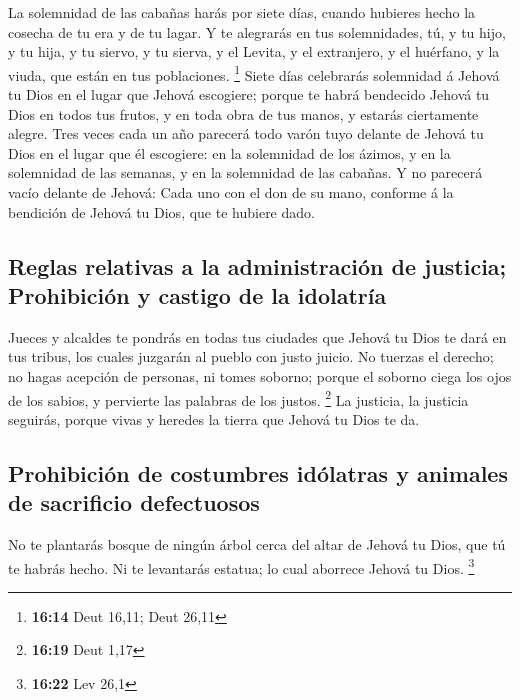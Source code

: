  La solemnidad de las cabañas harás por siete días,
cuando hubieres hecho la cosecha de tu era y de tu lagar.
 Y te alegrarás en tus solemnidades, tú, y tu hijo, y tu
hija, y tu siervo, y tu sierva, y el Levita, y el extranjero, y el
huérfano, y la viuda, que están en tus poblaciones. \footnote{\textbf{16:14}
  Deut 16,11; Deut 26,11}  Siete días celebrarás
solemnidad á Jehová tu Dios en el lugar que Jehová escogiere; porque te
habrá bendecido Jehová tu Dios en todos tus frutos, y en toda obra de
tus manos, y estarás ciertamente alegre.  Tres veces cada
un año parecerá todo varón tuyo delante de Jehová tu Dios en el lugar
que él escogiere: en la solemnidad de los ázimos, y en la solemnidad de
las semanas, y en la solemnidad de las cabañas. Y no parecerá vacío
delante de Jehová:  Cada uno con el don de su mano,
conforme á la bendición de Jehová tu Dios, que te hubiere dado.

\hypertarget{reglas-relativas-a-la-administraciuxf3n-de-justicia-prohibiciuxf3n-y-castigo-de-la-idolatruxeda}{%
\subsection{Reglas relativas a la administración de justicia;
Prohibición y castigo de la
idolatría}\label{reglas-relativas-a-la-administraciuxf3n-de-justicia-prohibiciuxf3n-y-castigo-de-la-idolatruxeda}}

 Jueces y alcaldes te pondrás en todas tus ciudades que
Jehová tu Dios te dará en tus tribus, los cuales juzgarán al pueblo con
justo juicio.  No tuerzas el derecho; no hagas acepción
de personas, ni tomes soborno; porque el soborno ciega los ojos de los
sabios, y pervierte las palabras de los justos. \footnote{\textbf{16:19}
  Deut 1,17}  La justicia, la justicia seguirás, porque
vivas y heredes la tierra que Jehová tu Dios te da.

\hypertarget{prohibiciuxf3n-de-costumbres-iduxf3latras-y-animales-de-sacrificio-defectuosos}{%
\subsection{Prohibición de costumbres idólatras y animales de sacrificio
defectuosos}\label{prohibiciuxf3n-de-costumbres-iduxf3latras-y-animales-de-sacrificio-defectuosos}}

 No te plantarás bosque de ningún árbol cerca del altar
de Jehová tu Dios, que tú te habrás hecho.  Ni te
levantarás estatua; lo cual aborrece Jehová tu Dios. \footnote{\textbf{16:22}
  Lev 26,1}

